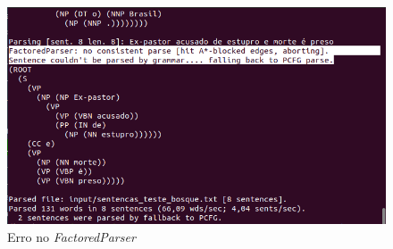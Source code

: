 \begin{figure}[!h]
    \centering
    \includegraphics[width=.8\textwidth,scale=1.5]{imagens/erro_factored_parser.png}
    \caption[Erro no \textit{FactoredParser}]{Erro no \textit{FactoredParser}}
    \label{fig:bosque_erro_factored}
\end{figure}